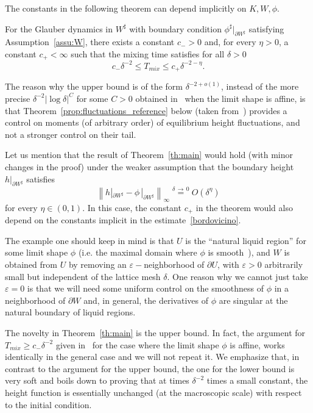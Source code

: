 \documentclass[AHL,Unicode,longabstracts,published]{cedram}
\renewcommand{\d}{{\sharp }}
\begin{document}
The constants in the following theorem can depend implicitly on $K,W,\phi$.
\begin{theo}\label{th:main}
For the Glauber dynamics in $W^\d$ with boundary condition $\phi^\d|_{\partial W^\d}$ satisfying Assumption~\ref{assu:W}, there exists a constant $c_->0$ and, for every $\eta>0$, a constant $c_+<\infty$ such that the mixing time satisfies for all $\delta>0$
\begin{equation}\label{eq:main}
c_- \delta^{-2}\le T_{mix}\le c_+\delta^{-2-\eta}.
\end{equation}
\end{theo}

The reason why the upper bound is of the form $\delta^{-2+o(1)}$, instead of the more precise $\delta^{-2}|\log \delta|^C$ for some $C>0$ obtained in~\cite{CMT} when the limit shape is affine, is that
Theorem~\ref{prop:fluctuations_reference} below (taken from~\cite{L_arxiv}) provides a control on moments (of arbitrary order) of equilibrium height fluctuations, and not a stronger control on their tail.

Let us mention that the result of Theorem~\ref{th:main} would hold (with minor changes in the proof) under the weaker assumption that the boundary height $h|_{\partial W^\d}$ satisfies
\begin{equation}\label{bordovicino}
\left\|h|_{\partial W^\d}-\phi\,|_{\partial W^\d}\right\|_\infty\stackrel {\delta\,\to\,0}=O(\delta^\eta)
\end{equation}
for every $\eta\in (0,1)$. In this case, the constant $c_+$ in the theorem would also depend on the constants implicit in the estimate~\eqref{bordovicino}.



\begin{rema}
The example one should keep in mind is that $U$ is the ``natural liquid region'' for some limit shape $\phi$ (i.e. the maximal domain where $\phi$ is smooth~\cite{KO}), and $W$ is obtained from $U$ by removing an $\varepsilon-$neighborhood of $\partial U$, with $\varepsilon>0$ arbitrarily small but independent of the lattice mesh $\delta$. One reason why we cannot just take $\varepsilon=0$ is that we will need some uniform control on the smoothness of $\phi$ in a neighborhood of $\partial W$ and, in general, the derivatives of $\phi$ are singular at the natural boundary of liquid regions.
\end{rema}

\begin{rema}
The novelty in Theorem~\ref{th:main} is the upper bound. In fact, the argument for $T_{mix}\ge c_-\delta^{-2}$ given in~\cite[Sec.~5.2]{LT_ptrf} for the case where the limit shape $\phi$ is affine, works identically in the general case and we will not repeat it. We emphasize that, in contrast to the argument for the upper bound, the one for the lower bound is very soft and boils down to proving that at times $\delta^{-2}$ times a small constant, the height function is essentially unchanged (at the macroscopic scale) with respect to the initial condition.
\end{rema}
\end{document}
